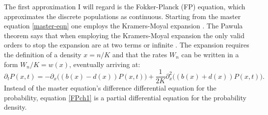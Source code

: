 The first approximation I will regard is the Fokker-Planck (FP) equation, which approximates the discrete populations as continuous. 
Starting from the master equation \ref{master-eqn} one employs the Kramers-Moyal expansion \cite{Gardiner2004a}. 
The Pawula theorem says that when employing the Kramers-Moyal expansion the only valid orders to stop the expansion are at two terms or infinite \cite{VanKampen1992}. 
The expansion requires the definition of a density $x=n/K$ and that the rates $W_n$ can be written in a form $W_n/K = w(x)$, eventually arriving at:
\begin{equation}
\partial_t P(x,t) = - \partial_x\big( (b(x) - d(x)) P(x,t) \big) + \frac{1}{2 K} \partial_x^2 \Big( (b(x) + d(x)) P(x,t) \Big). 
 \label{FPch1}
\end{equation}
Instead of the master equation's difference differential equation for the probability, equation \ref{FPch1} is a partial differential equation for the probability density. %
